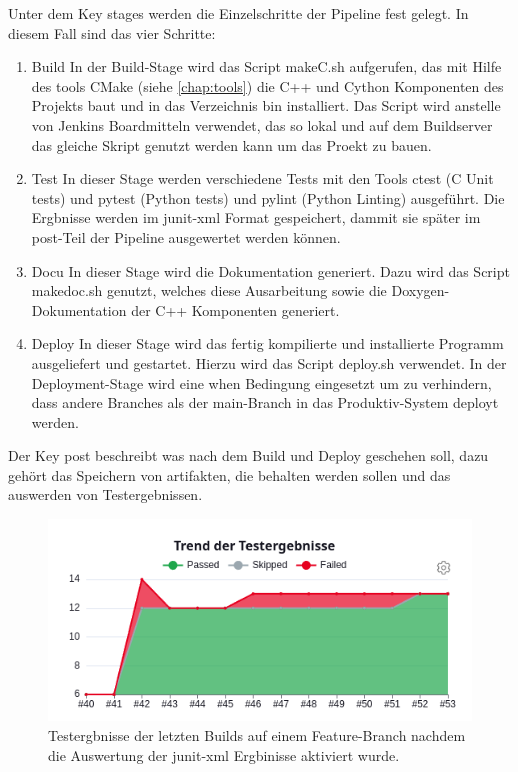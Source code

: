 Unter dem Key \glqq  stages\grqq{} werden die Einzelschritte der Pipeline fest gelegt. In diesem Fall sind das vier Schritte: 
\begin{enumerate}
    \item{Build} In der Build-Stage wird das Script makeC.sh aufgerufen, das mit Hilfe des tools CMake (siehe \autoref{chap:tools}) die C++ und Cython Komponenten des Projekts baut und in das Verzeichnis bin installiert. Das Script wird anstelle von Jenkins Boardmitteln verwendet, das so lokal und auf dem Buildserver das gleiche Skript genutzt werden kann um das Proekt zu bauen.
    \item{Test} In dieser Stage werden verschiedene Tests mit den Tools ctest (C Unit tests) und pytest (Python tests) und pylint (Python Linting) ausgeführt. Die Ergbnisse werden im junit-xml Format gespeichert, dammit sie später im post-Teil der Pipeline ausgewertet werden können.
    \item{Docu} In dieser Stage wird die Dokumentation generiert. Dazu wird das Script makedoc.sh genutzt, welches diese Ausarbeitung sowie die Doxygen-Dokumentation der C++ Komponenten generiert.  
    \item{Deploy} In dieser Stage wird das fertig kompilierte und installierte Programm ausgeliefert und gestartet. Hierzu wird das Script deploy.sh verwendet. 
    In der Deployment-Stage wird eine \glqq when\grqq{} Bedingung eingesetzt um zu verhindern, dass andere Branches als der main-Branch in das Produktiv-System deployt werden.  
\end{enumerate}

Der Key \glqq post\grqq{} beschreibt was nach dem Build und Deploy geschehen soll, dazu gehört das Speichern von artifakten, die behalten werden sollen und das auswerden von Testergebnissen.

\begin{figure}
    \label{fig:test_results}
    \centering
    \includegraphics[scale=0.4]{res/Jenkins_test_results.png}
    \caption{Testergbnisse der letzten Builds auf einem Feature-Branch nachdem die Auswertung der junit-xml Ergbinisse aktiviert wurde.}
\end{figure}

